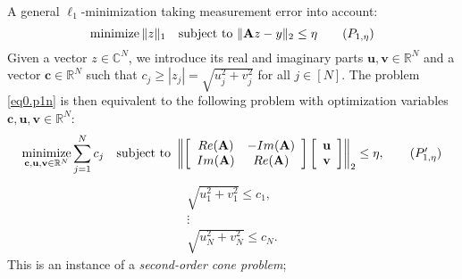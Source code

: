 A general $\ell_1$-minimization taking measurement error into account:
\begin{equation}
    \mathop{\mathrm{minimize}}\|z\|_1 \quad \text{subject to } \|\mathbf{A}z-y\|_2 \leq \eta \tag{$P_{1,\eta}$}
    \label{eq0.p1n}
\end{equation}
Given a vector $z \in \mathbb{C}^N$, we introduce its real and imaginary parts $\mathbf{u,v} \in \mathbb{R}^N$ and a vector $\mathbf{c} \in \mathbb{R}^N$ such that $c_j \geq \left|z_j\right| = \sqrt{u_j^2 + v_j^2}$ for all $j \in [N]$. The problem \cref{eq0.p1n} is then equivalent to the following problem with optimization variables $\mathbf{c,u,v} \in \mathbb{R}^N$:
\begin{equation}
    \mathop{\mathrm{minimize}}\limits_{\mathbf{c,u,v} \in \mathbb{R}^N} \sum\limits_{j=1}^N c_j \quad \text{subject to } \left\|\left[ 
        \begin{array}{cc}
            Re(\mathbf{A}) & -Im(\mathbf{A}) \\
            Im(\mathbf{A}) & Re(\mathbf{A})
        \end{array}
        \right]
        \left[ 
         \begin{array}{c}
            \mathbf{u}\\
            \mathbf{v}
        \end{array}
    \right]\right\|_2 \leq \eta, \tag{$P_{1,\eta}'$}
    \label{eq0.p1n'}
\end{equation}
\[
    \begin{array}{c}
        \sqrt{u_1^2 + v_1^2} \leq c_1, \\
        \vdots \\
        \sqrt{u_N^2 + v_N^2} \leq c_N.
    \end{array}
\]
This is an instance of a \emph{\textcolor[rgb]{1,0,0}{second-order cone problem}};


